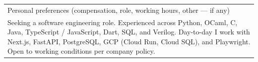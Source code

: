 \documentclass[a4paper,10pt]{article}
\newcommand{\fieldlabel}[1]{\small\textsf{#1}}
\begin{document}
\noindent
\begin{tabular}{|m{\dimexpr\linewidth-2\tabcolsep-2\arrayrulewidth\relax}|}
  \hline
  \fieldlabel{Personal preferences (compensation, role, working hours, other — if any)}\\
  \begin{minipage}[t][5cm][t]{\linewidth}
    \setlength{\parskip}{4pt}
    Seeking a software engineering role. Experienced across Python, OCaml, C, Java, TypeScript / JavaScript, Dart, SQL, and Verilog. Day-to-day I work with Next.js, FastAPI, PostgreSQL, GCP (Cloud Run, Cloud SQL), and Playwright. Open to working conditions per company policy.
  \end{minipage}
  \\
  \hline
\end{tabular}
\end{document}
